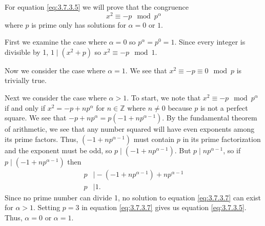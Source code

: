 \documentclass[12 pt]{amsart}
\begin{document}
  For equation \ref{eq:3.7.3.5} we will prove that the congruence
  \begin{equation}
    \label{eq:3.7.3.7}
    x^2 \equiv -p \mod p^{\alpha}
  \end{equation}
  where $p$ is prime only has solutions for $\alpha = 0$ or $1$.

  First we examine the case where $\alpha = 0$
  so $p^{\alpha} = p^0 = 1$.
  Since every integer is divisible by 1, 
  $1 \mid (x^2 + p)$ so $x^2 \equiv -p \mod 1$.

  Now we consider the case where $\alpha = 1$.
  We see that $x^2 \equiv -p \equiv 0 \mod p$ is trivially true.

  Next we consider the case where $\alpha > 1$.
  To start, we note that 
  $x^2 \equiv -p \mod p^{\alpha}$ if and only if 
  $x^2 = -p + np^{\alpha}$ for $n \in \mathbb{Z}$
  where $n \neq 0$ because $p$ is not a perfect square.
  We see that $-p + np^{\alpha} = p (-1 + np^{\alpha - 1})$.
  By the fundamental theorem of arithmetic, we see that any 
  number squared will have even exponents among its prime factors.
  Thus, $(-1 + np^{\alpha - 1})$ must contain $p$ in its prime
  factorization and the exponent must be odd, so 
  $p \mid (-1 + np^{\alpha - 1})$.
  But $p \mid np^{\alpha - 1}$, so if 
  $p \mid (-1 + np^{\alpha - 1})$ then 
  \begin{align*}
    p &\mid -(-1 + np^{\alpha - 1}) +  np^{\alpha - 1} \\
    p &\mid 1. 
  \end{align*}
  Since no prime number can divide 1, no solution to 
  equation \ref{eq:3.7.3.7} can exist for $\alpha > 1$.
  Setting $p = 3$ in equation  \ref{eq:3.7.3.7} gives us 
  equation \ref{eq:3.7.3.5}.
  Thus, $\alpha = 0$ or $\alpha = 1$.
\end{document}
